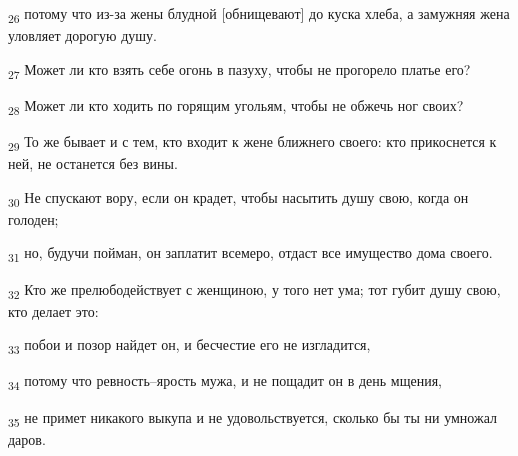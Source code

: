 \begin{tcolorbox}
\textsubscript{26} потому что из-за жены блудной [обнищевают] до куска хлеба, а замужняя жена уловляет дорогую душу.
\end{tcolorbox}
\begin{tcolorbox}
\textsubscript{27} Может ли кто взять себе огонь в пазуху, чтобы не прогорело платье его?
\end{tcolorbox}
\begin{tcolorbox}
\textsubscript{28} Может ли кто ходить по горящим угольям, чтобы не обжечь ног своих?
\end{tcolorbox}
\begin{tcolorbox}
\textsubscript{29} То же бывает и с тем, кто входит к жене ближнего своего: кто прикоснется к ней, не останется без вины.
\end{tcolorbox}
\begin{tcolorbox}
\textsubscript{30} Не спускают вору, если он крадет, чтобы насытить душу свою, когда он голоден;
\end{tcolorbox}
\begin{tcolorbox}
\textsubscript{31} но, будучи пойман, он заплатит всемеро, отдаст все имущество дома своего.
\end{tcolorbox}
\begin{tcolorbox}
\textsubscript{32} Кто же прелюбодействует с женщиною, у того нет ума; тот губит душу свою, кто делает это:
\end{tcolorbox}
\begin{tcolorbox}
\textsubscript{33} побои и позор найдет он, и бесчестие его не изгладится,
\end{tcolorbox}
\begin{tcolorbox}
\textsubscript{34} потому что ревность--ярость мужа, и не пощадит он в день мщения,
\end{tcolorbox}
\begin{tcolorbox}
\textsubscript{35} не примет никакого выкупа и не удовольствуется, сколько бы ты ни умножал даров.
\end{tcolorbox}
